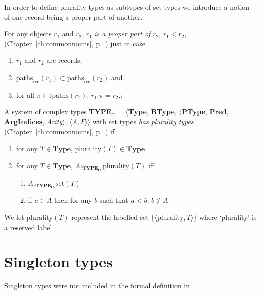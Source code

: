 In order to define plurality types as subtypes of set types we
introduce a notion of one record being a proper part of another.

For any objects $r_1$ and $r_2$, $r_1$ \textit{is a proper
    part of} $r_2$, $r_1<r_2$, (Chapter~\ref{ch:commonnouns},
  p.~\pageref{ex:properpart}) just in case
  \begin{enumerate}
  \item $r_1$ and $r_2$ are records, 
  \item
    $\mathrm{paths}_{\text{rec}}(r_1)\subset\mathrm{paths}_{\text{rec}}(r_2)$
      and
    \item for all $\pi\in\mathrm{tpaths}(r_1)$, $r_1.\pi=r_2.\pi$
    \end{enumerate} 

A system of complex types {\bf TYPE$_C$} = $\langle${\bf Type}, {\bf BType},
$\langle$\textbf{PType}, {\bf Pred}, \textbf{ArgIndices}, {\it
  Arity\/}$\rangle$, $\langle A,F\rangle$$\rangle$ with set types
\textit{has plurality types} (Chapter~\ref{ch:commonnouns},
p.~\pageref{ex:plurality-types}) if
\begin{enumerate} 
 
\item for any $T \in \textbf{Type}$, $\mathrm{plurality}(T) \in \textbf{Type}$ 
 
\item for any $T \in \textbf{Type}$, 
$A:_{\mathbf{TYPE_C}}\mathrm{plurality}(T)$ iff  
\begin{enumerate} 
 
\item $A :_{\mathbf{TYPE_C}} \mathrm{set}(T)$ 
 
\item if $a\in A$ then for any $b$ such that $a<b$, $b\not\in A$ 
 
\end{enumerate} 
  
   
 
\end{enumerate}

We let $\mathrm{plurality}(T)$ represent the labelled set
$\{\langle\text{plurality},T\rangle\}$ where `plurality' is a reserved
label. 

\section{Singleton types}
\label{app:singletontypes}

Singleton types were not included in the formal definition in \cite{Cooper2012}.

